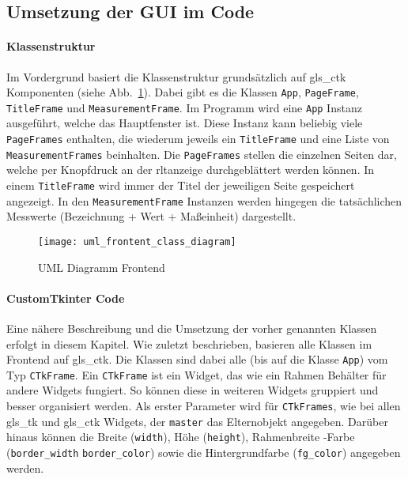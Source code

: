 \subsection{Umsetzung der GUI im Code}\label{tkintercode}
\paragraph{Klassenstruktur}
Im Vordergrund basiert die Klassenstruktur grundsätzlich auf \gls{gls_ctk} Komponenten (siehe Abb.~\ref{fig:klassenstruktur_frontend}). Dabei gibt es die Klassen \lstinline{App}, \lstinline{PageFrame}, \lstinline{TitleFrame} und \lstinline{MeasurementFrame}. Im Programm wird eine \lstinline{App} Instanz ausgeführt, welche das Hauptfenster ist. Diese Instanz kann beliebig viele \lstinline{PageFrames} enthalten, die wiederum jeweils ein \lstinline{TitleFrame} und eine Liste von \lstinline{MeasurementFrames} beinhalten. Die \lstinline{PageFrames} stellen die einzelnen Seiten dar, welche per Knopfdruck an der \acs{rltanzeige} durchgeblättert werden können. In einem \lstinline{TitleFrame} wird immer der Titel der jeweiligen Seite gespeichert \bzw angezeigt. In den \lstinline{MeasurementFrame} Instanzen werden hingegen die tatsächlichen Messwerte (Bezeichnung + Wert + Maßeinheit) dargestellt.

\begin{figure}[H]
	\centering
	\texttt{[image: uml\_frontent\_class\_diagram]}
	\caption{UML Diagramm Frontend \label{fig:klassenstruktur_frontend}}
\end{figure}

\paragraph{CustomTkinter Code}

Eine nähere Beschreibung und die Umsetzung der vorher genannten Klassen erfolgt in diesem Kapitel. 
\newline Wie zuletzt beschrieben, basieren alle Klassen im Frontend auf \gls{gls_ctk}. Die Klassen sind dabei alle (bis auf die Klasse \lstinline{App}) vom Typ \lstinline{CTkFrame}. Ein \lstinline{CTkFrame} ist ein Widget, das wie ein Rahmen \bzw Behälter für andere Widgets fungiert. So können diese in weiteren Widgets gruppiert und besser organisiert werden. Als erster Parameter wird für \lstinline{CTkFrames}, wie bei allen \gls{gls_tk} und \gls{gls_ctk} Widgets, der \lstinline{master} \bzw das Elternobjekt angegeben. Darüber hinaus können die Breite (\lstinline{width}), Höhe (\lstinline{height}), Rahmenbreite \bzw -Farbe (\lstinline{border_width} \bzw \lstinline{border_color}) sowie die Hintergrundfarbe (\lstinline{fg_color}) angegeben werden. \cite[vgl.][]{Schimansky:o.J.}

